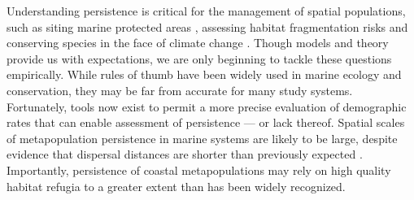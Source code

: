 \documentclass[12pt, oneside]{article}   	%
\begin{document}

Understanding persistence is critical for the management of spatial populations, such as siting marine protected areas \citep{kaplan_model-based_2009}, assessing habitat fragmentation risks \citep{smith2002population, fahrig2001much} and conserving species in the face of climate change \citep{coleman2017anticipating, fuller2015persistence}. Though models and theory provide us with expectations, we are only beginning to tackle these questions empirically. While rules of thumb have been widely used in marine ecology and conservation, they may be far from accurate for many study systems. Fortunately, tools now exist to permit a more precise evaluation of demographic rates that can enable assessment of persistence --- or lack thereof. Spatial scales of metapopulation persistence in marine systems are likely to be large, despite evidence that dispersal distances are shorter than previously expected \citep{jones1999self, almany2007local}. Importantly, persistence of coastal metapopulations may rely on high quality habitat refugia to a greater extent than has been widely recognized. %
\end{document}
